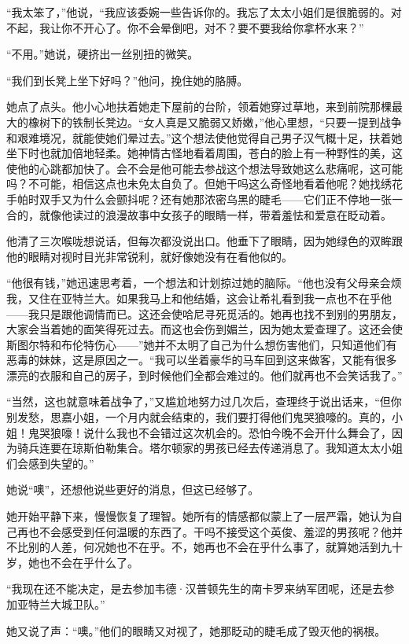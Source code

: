 \par “我太笨了，”他说，“我应该委婉一些告诉你的。我忘了太太小姐们是很脆弱的。对不起，我让你不开心了。你不会晕倒吧，对不？要不要我给你拿杯水来？”
\par “不用。”她说，硬挤出一丝别扭的微笑。
\par “我们到长凳上坐下好吗？”他问，挽住她的胳膊。
\par 她点了点头。他小心地扶着她走下屋前的台阶，领着她穿过草地，来到前院那棵最大的橡树下的铁制长凳边。“女人真是又脆弱又娇嫩，”他心里想，“只要一提到战争和艰难境况，就能使她们晕过去。”这个想法使他觉得自己男子汉气概十足，扶着她坐下时也就加倍地轻柔。她神情古怪地看着周围，苍白的脸上有一种野性的美，这使他的心跳都加快了。会不会是他可能去参战这个想法导致她这么悲痛呢，这可能吗？不可能，相信这点也未免太自负了。但她干吗这么奇怪地看着他呢？她找绣花手帕时双手又为什么会颤抖呢？还有她那浓密乌黑的睫毛——它们正不停地一张一合的，就像他读过的浪漫故事中女孩子的眼睛一样，带着羞怯和爱意在眨动着。
\par 他清了三次喉咙想说话，但每次都没说出口。他垂下了眼睛，因为她绿色的双眸跟他的眼睛对视时目光非常锐利，就好像她没有在看他似的。
\par “他很有钱，”她迅速思考着，一个想法和计划掠过她的脑际。“他也没有父母亲会烦我，又住在亚特兰大。如果我马上和他结婚，这会让希礼看到我一点也不在乎他——我只是跟他调情而已。这还会使哈尼寻死觅活的。她再也找不到别的男朋友，大家会当着她的面笑得死过去。而这也会伤到媚兰，因为她太爱查理了。这还会使斯图尔特和布伦特伤心——”她并不太明了自己为什么想伤害他们，只知道他们有恶毒的妹妹，这是原因之一。“我可以坐着豪华的马车回到这来做客，又能有很多漂亮的衣服和自己的房子，到时候他们全都会难过的。他们就再也不会笑话我了。”
\par “当然，这也就意味着战争了，”又尴尬地努力过几次后，查理终于说出话来，“但你别发愁，思嘉小姐，一个月内就会结束的，我们要打得他们鬼哭狼嚎的。真的，小姐！鬼哭狼嚎！说什么我也不会错过这次机会的。恐怕今晚不会开什么舞会了，因为骑兵连要在琼斯伯勒集合。塔尔顿家的男孩已经去传递消息了。我知道太太小姐们会感到失望的。”
\par 她说“噢”，还想他说些更好的消息，但这已经够了。
\par 她开始平静下来，慢慢恢复了理智。她所有的情感都似蒙上了一层严霜，她认为自己再也不会感受到任何温暖的东西了。干吗不接受这个英俊、羞涩的男孩呢？他并不比别的人差，何况她也不在乎。不，她再也不会在乎什么事了，就算她活到九十岁，她也不会在乎什么了。
\par “我现在还不能决定，是去参加韦德·汉普顿先生的南卡罗来纳军团呢，还是去参加亚特兰大城卫队。”
\par 她又说了声：“噢。”他们的眼睛又对视了，她那眨动的睫毛成了毁灭他的祸根。
